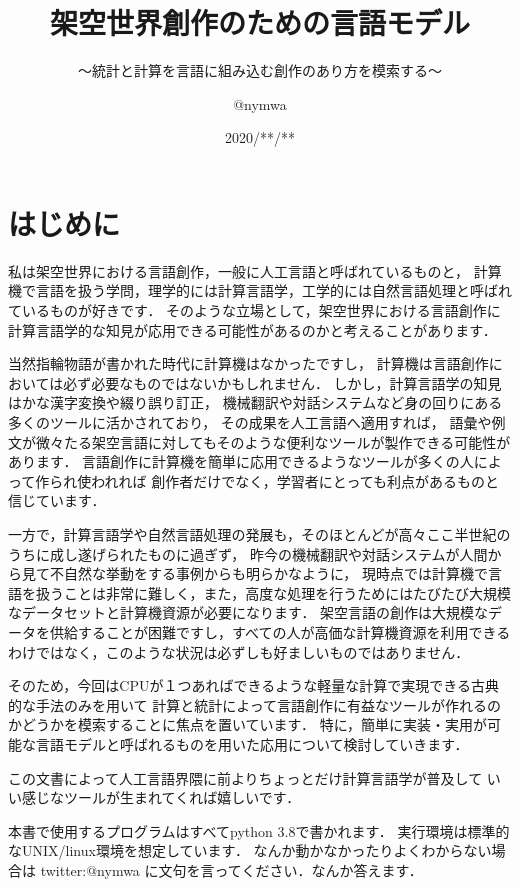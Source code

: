 \documentclass[11pt]{report}
\title{架空世界創作のための言語モデル}
\subtitle{〜統計と計算を言語に組み込む創作のあり方を模索する〜}
\author{@nymwa}
\date{2020/**/**}
\begin{document}
\maketitle

\renewcommand{\contentsname}{目次}
\tableofcontents

\chapter{はじめに}

私は架空世界における言語創作，一般に人工言語と呼ばれているものと，
計算機で言語を扱う学問，理学的には計算言語学，工学的には自然言語処理と呼ばれているものが好きです．
そのような立場として，架空世界における言語創作に計算言語学的な知見が応用できる可能性があるのかと考えることがあります．

当然指輪物語が書かれた時代に計算機はなかったですし，
計算機は言語創作においては必ず必要なものではないかもしれません．
しかし，計算言語学の知見はかな漢字変換や綴り誤り訂正，
機械翻訳や対話システムなど身の回りにある多くのツールに活かされており，
その成果を人工言語へ適用すれば，
語彙や例文が微々たる架空言語に対してもそのような便利なツールが製作できる可能性があります．
言語創作に計算機を簡単に応用できるようなツールが多くの人によって作られ使われれば
創作者だけでなく，学習者にとっても利点があるものと信じています．

一方で，計算言語学や自然言語処理の発展も，そのほとんどが高々ここ半世紀のうちに成し遂げられたものに過ぎず，
昨今の機械翻訳や対話システムが人間から見て不自然な挙動をする事例からも明らかなように，
現時点では計算機で言語を扱うことは非常に難しく，また，高度な処理を行うためにはたびたび大規模なデータセットと計算機資源が必要になります．
架空言語の創作は大規模なデータを供給することが困難ですし，すべての人が高価な計算機資源を利用できるわけではなく，このような状況は必ずしも好ましいものではありません．

そのため，今回はCPUが１つあればできるような軽量な計算で実現できる古典的な手法のみを用いて
計算と統計によって言語創作に有益なツールが作れるのかどうかを模索することに焦点を置いています．
特に，簡単に実装・実用が可能な言語モデルと呼ばれるものを用いた応用について検討していきます．

この文書によって人工言語界隈に前よりちょっとだけ計算言語学が普及して
いい感じなツールが生まれてくれば嬉しいです．

本書で使用するプログラムはすべてpython 3.8で書かれます．
実行環境は標準的なUNIX/linux環境を想定しています．
なんか動かなかったりよくわからない場合は twitter:@nymwa に文句を言ってください．なんか答えます．
\end{document}
